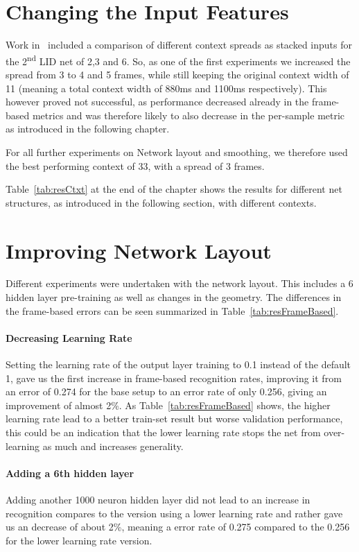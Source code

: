 \section{Changing the Input Features}
\label{sec:LIDNetwork:Input}

Work in~\cite{Mueller2016b} included a comparison of different context spreads as stacked inputs for the 2\textsuperscript{nd} LID net of 2,3 and 6. So, as one of the first experiments we increased the spread from 3 to 4 and 5 frames, while still keeping the original context width of 11 (meaning a total context width of 880ms and 1100ms respectively). This however proved not successful, as performance decreased already in the frame-based metrics and was therefore likely to also decrease in the per-sample metric as introduced in the following chapter. 

For all further experiments on Network layout and smoothing, we therefore used the best performing context of 33, with a spread of 3 frames.

Table~\ref{tab:resCtxt} at the end of the chapter shows the results for different net structures, as introduced in the following section, with different contexts.

\section{Improving Network Layout}
\label{sec:LIDNetwork:Layout}

Different experiments were undertaken with the network layout. This includes a 6 hidden layer pre-training as well as changes in the geometry. The differences in the frame-based errors can be seen summarized in Table~\ref{tab:resFrameBased}. 

\paragraph{Decreasing Learning Rate} Setting the learning rate of the output layer training to 0.1 instead of the default 1, gave us the first increase in frame-based recognition rates, improving it from an error of 0.274 for the base setup to an error rate of only 0.256, giving an improvement of almost 2\%. As Table~\ref{tab:resFrameBased} shows, the higher learning rate lead to a better train-set result but worse validation performance, this could be an indication that the lower learning rate stops the net from over-learning as much and increases generality.

\paragraph{Adding a 6th hidden layer} Adding another 1000 neuron hidden layer did not lead to an increase in recognition compares to the version using a lower learning rate and rather gave us an decrease of about 2\%, meaning a error rate of 0.275 compared to the 0.256 for the lower learning rate version.


